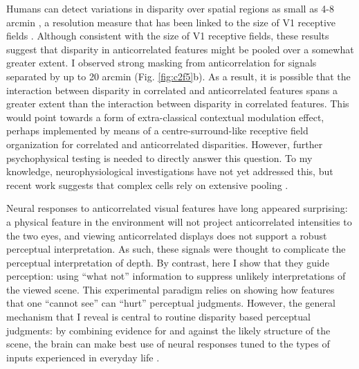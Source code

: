 Humans can detect variations in disparity over spatial regions as small as 4-8 arcmin \cite{Harris:1997kx,Banks:2004oh}, a resolution measure that has been linked to the size of V1 receptive fields \cite{Nienborg:2004ra}. Although consistent with the size of V1 receptive fields, these results suggest that disparity in anticorrelated features might be pooled over a somewhat greater extent. I observed strong masking from anticorrelation for signals separated by up to 20 arcmin (Fig. \ref{fig:c2f5}b). As a result, it is possible that the interaction between disparity in correlated and anticorrelated features spans a greater extent than the interaction between disparity in correlated features. This would point towards a form of extra-classical contextual modulation effect, perhaps implemented by means of a centre-surround-like receptive field organization for correlated and anticorrelated disparities. However, further psychophysical testing is needed to directly answer this question. To my knowledge, neurophysiological investigations have not yet addressed this, but recent work suggests that complex cells rely on extensive pooling \cite{Sasaki:2010pi,Kato:2016fk}.

Neural responses to anticorrelated visual features have long appeared surprising: a physical feature in the environment will not project anticorrelated intensities to the two eyes, and viewing anticorrelated displays does not support a robust perceptual interpretation. As such, these signals were thought to complicate the perceptual interpretation of depth. By contrast, here I show that they guide perception: using ``what not'' information to suppress unlikely interpretations of the viewed scene\cite{Goncalves:2017aa}. This experimental paradigm relies on showing how features that one ``cannot see'' can ``hurt'' perceptual judgments. However, the general mechanism that I reveal is central to routine disparity based perceptual judgments: by combining evidence for and against the likely structure of the scene, the brain can make best use of neural responses tuned to the types of inputs experienced in everyday life \cite{Goncalves:2017aa}.




